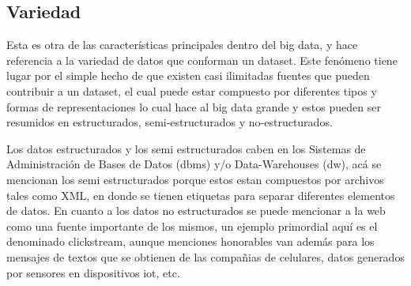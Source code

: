 \subsection{Variedad}
\label{ssec:variedad}

Esta es otra de las características principales dentro del big data,
y hace referencia a la variedad de datos que conforman un \gls{dataset}. Este
fenómeno tiene lugar por el simple hecho de que existen casi ilimitadas fuentes
que pueden contribuir a un \gls{dataset}, el cual puede estar compuesto por
diferentes tipos y formas de representaciones\cite{che2013} lo cual hace al big
data grande y estos pueden ser resumidos en estructurados, semi-estructurados y
no-estructurados\cite{sagiroglu2013}.

Los datos estructurados y los semi estructurados caben en los Sistemas de Administración de Bases de
Datos (\acrshort{dbms}) y/o Data-Warehouses (\acrshort{dw}), acá se mencionan
los semi estructurados porque estos estan compuestos por archivos tales como
XML, en donde se tienen etiquetas para separar diferentes elementos de datos.
En cuanto a los datos no estructurados se puede mencionar a la web como una
fuente importante de los mismos, un ejemplo primordial aquí es el denominado
\gls{clickstream}\cites{russom2011, albert2010-c05}, aunque menciones
honorables van además para los mensajes de textos que se obtienen de las
compañias de celulares, datos generados por sensores en dispositivos
\acrshort{iot}, etc.
